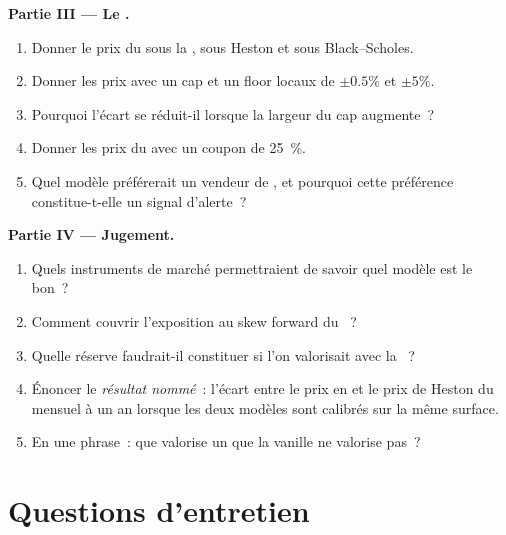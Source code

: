 \begin{problem}
\medskip\noindent\textbf{Partie III --- Le .}
\begin{enumerate}[resume]
\item Donner le prix du  sous la , sous Heston et sous Black--Scholes.
\item Donner les prix avec un cap et un floor locaux de $\pm0.5\%$ et $\pm5\%$.
\item Pourquoi l'écart se réduit-il lorsque la largeur du cap augmente~?
\item Donner les prix du  avec un coupon de 25~\%.
\item Quel modèle préférerait un vendeur de , et pourquoi cette préférence constitue-t-elle un signal d'alerte~?
\end{enumerate}

\medskip\noindent\textbf{Partie IV --- Jugement.}
\begin{enumerate}[resume]
\item Quels instruments de marché permettraient de savoir quel modèle est le bon~?
\item Comment couvrir l'exposition au skew forward du ~?
\item Quelle réserve faudrait-il constituer si l'on valorisait avec la ~?
\item Énoncer le \emph{résultat nommé}~: l'écart entre le prix en  et le prix de Heston du  mensuel
à un an lorsque les deux modèles sont calibrés sur la même surface.
\item En une phrase~: que valorise un  que la vanille ne valorise pas~?
\end{enumerate}
\end{problem}

\section{Questions d'entretien}

